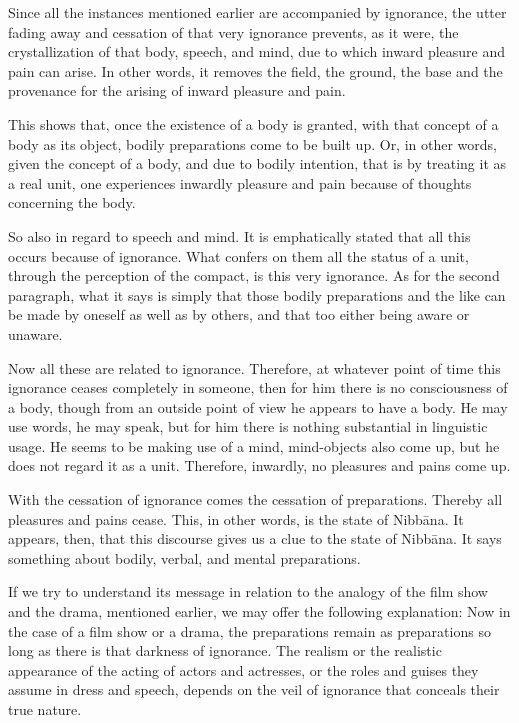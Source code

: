 Since all the instances mentioned earlier are accompanied by ignorance, the utter fading away and cessation of that very ignorance prevents, as it were, the crystallization of that body, speech, and mind, due to which inward pleasure and pain can arise. In other words, it removes the field, the ground, the base and the provenance for the arising of inward pleasure and pain.

This shows that, once the existence of a body is granted, with that concept of a body as its object, bodily preparations come to be built up. Or, in other words, given the concept of a body, and due to bodily intention, that is by treating it as a real unit, one experiences inwardly pleasure and pain because of thoughts concerning the body.

So also in regard to speech and mind. It is emphatically stated that all this occurs because of ignorance. What confers on them all the status of a unit, through the perception of the compact, is this very ignorance. As for the second paragraph, what it says is simply that those bodily preparations and the like can be made by oneself as well as by others, and that too either being aware or unaware.

Now all these are related to ignorance. Therefore, at whatever point of time this ignorance ceases completely in someone, then for him there is no consciousness of a body, though from an outside point of view he appears to have a body. He may use words, he may speak, but for him there is nothing substantial in linguistic usage. He seems to be making use of a mind, mind-objects also come up, but he does not regard it as a unit. Therefore, inwardly, no pleasures and pains come up.

With the cessation of ignorance comes the cessation of preparations. Thereby all pleasures and pains cease. This, in other words, is the state of Nibbāna. It appears, then, that this discourse gives us a clue to the state of Nibbāna. It says something about bodily, verbal, and mental preparations.

If we try to understand its message in relation to the analogy of the film show and the drama, mentioned earlier, we may offer the following explanation: Now in the case of a film show or a drama, the preparations remain as preparations so long as there is that darkness of ignorance. The realism or the realistic appearance of the acting of actors and actresses, or the roles and guises they assume in dress and speech, depends on the veil of ignorance that conceals their true nature.

